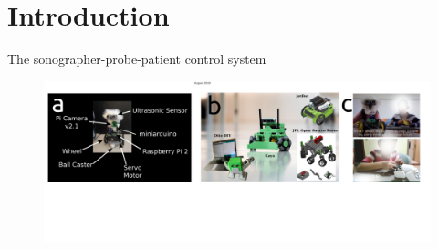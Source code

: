 \section{Introduction}


{
\begin{frame}{The sonographer-probe-patient control system}
      \begin{figure}
        \centering
        \includegraphics[width=1.0\textwidth]{./figures/air4children/versions/drawing-v02.png}
      \end{figure}
\end{frame}
}
